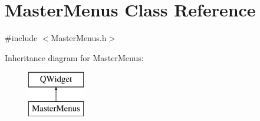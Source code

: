 \hypertarget{class_master_menus}{\section{Master\-Menus Class Reference}
\label{class_master_menus}
}


{\ttfamily \#include $<$Master\-Menus.\-h$>$}

Inheritance diagram for Master\-Menus\-:\begin{figure}[H]
\begin{center}
\leavevmode
\includegraphics[height=2.000000cm]{class_master_menus}
\end{center}
\end{figure}
